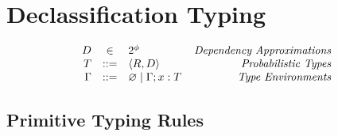 \renewcommand{\unity}[2]{U(#1, #2)}
\renewcommand{\ty}{T}
\newcommand{\eset}{D}
\newcommand{\dty}[2]{\langle #1, #2 \rangle}
\newcommand{\sharet}[1]{\mathrm{shares}(#1)}
\newcommand{\cvec}[1]{[#1]}
\newcommand{\secopent}{\mathrm{secopen}}
\newcommand{\declasst}[1]{\mathrm{declass}(#1)}
\renewcommand{\view}{\mathit{view}}
\newcommand{\revealed}{\mathit{revealed}}
\newcommand{\sty}{\varsigma}
\newcommand{\noise}{\mathrm{noise}}
\newcommand{\owners}{\mathrm{owners}}
\newcommand{\federation}{I_{\mathit{fed}}}

\section{Declassification Typing}

$$
\begin{array}{rcl@{\hspace{4mm}}r}
\eset &\in& 2^{\phi} & \gdesc{Dependency Approximations}\\ 
\ty &::=& \dty{R}{\eset} & \gdesc{Probabilistic Types} \\
\Gamma &::=& \varnothing \mid \Gamma; x : \ty & \gdesc{Type Environments}
\end{array}
$$

\subsection{Primitive Typing Rules}

